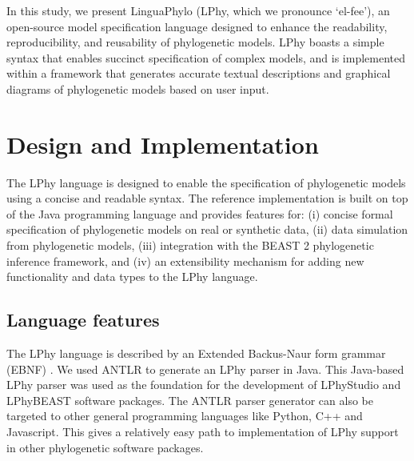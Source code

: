 \documentclass[10pt,letterpaper,table]{article}
\theoremstyle{definition}
\begin{document}
In this study, we present LinguaPhylo (LPhy, which we pronounce `el-fee'), an open-source model specification language designed to enhance the readability, reproducibility, and reusability of phylogenetic models. LPhy boasts a simple syntax that enables succinct specification of complex models, and is implemented within a framework that generates accurate textual descriptions and graphical diagrams of phylogenetic models based on user input.

\section{Design and Implementation}
The LPhy language is designed to enable the specification of phylogenetic models using a concise and readable syntax.  
The reference implementation is built on top of the Java programming language and provides features for: 
(i) concise formal specification of phylogenetic models on real or synthetic data, (ii) data simulation from phylogenetic models, (iii) integration with the BEAST 2 phylogenetic inference framework, and (iv) an extensibility mechanism for adding new functionality and data types to the LPhy language.

\subsection{Language features}


The LPhy language is described by an Extended Backus-Naur form grammar (EBNF) \cite{ebnf}. 
We used ANTLR \cite{parr1995antlr,parr2013definitive} to generate an LPhy parser in Java. 
This Java-based LPhy parser was used as the foundation for the development of LPhyStudio and LPhyBEAST software packages. 
The ANTLR parser generator can also be targeted to other general programming languages like Python, C++ and Javascript. 
This gives a relatively easy path to implementation of LPhy support in other phylogenetic software packages.
\end{document}
